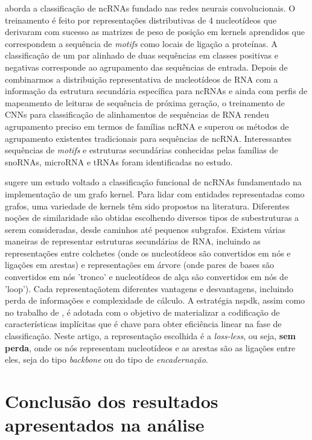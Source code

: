 \cite{cnn-article} aborda a classificação de ncRNAs fundado nas redes neurais convolucionais. O treinamento é feito por representações distributivas de 4 nucleotídeos que derivaram com sucesso as matrizes de peso de posição em kernels aprendidos que correspondem a sequência de \textit{motifs} como locais de ligação a proteínas. A classificação de um par alinhado de duas sequências em classes positivas e negativas corresponde ao agrupamento das sequências de entrada. Depois de combinarmos a distribuição
representativa de nucleotídeos de RNA com a informação da estrutura secundária específica para \ac{ncRNAs}
e ainda com perfis de mapeamento de leituras de sequência de próxima geração, o treinamento de CNNs
para classificação de alinhamentos de sequências de RNA rendeu agrupamento preciso em termos de famílias ncRNA e superou os métodos de agrupamento existentes tradicionais para sequências de ncRNA. Interessantes sequências de \textit{motifs} e estruturas secundárias conhecidas pelas famílias de snoRNAs, microRNA e tRNAs foram identificadas no estudo.

\cite{graph-kernel-article} sugere um estudo voltado a classificação funcional de ncRNAs fundamentado na implementação de um grafo kernel. Para lidar com entidades representadas como grafos, uma variedade de
kernels têm sido propostos na literatura. Diferentes noções de similaridade são obtidas escolhendo diversos tipos de subestruturas a serem consideradas, desde caminhos até pequenos subgrafos. Existem várias maneiras de representar estruturas secundárias de RNA, incluindo as representações entre colchetes (onde os nucleotídeos são convertidos em nós e ligações em arestas) e representações em árvore (onde pares de bases são convertidos em nós 'tronco' e nucleotídeos de alça são convertidos em nós de 'loop'). Cada representaçãotem diferentes vantagens e desvantagens, incluindo perda de informações e complexidade
de cálculo. A estratégia \ac{nspdk}, assim como no trabalho de \cite{snoReport-article}, é adotada com o objetivo de materializar a codificação de características implícitas que é chave para obter eficiência linear na fase de classificação. Neste artigo, a representação escolhida é a \textit{loss-less}, ou seja, \textbf{sem perda}, onde os nós representam nucleotídeos e as arestas são as ligações entre eles, seja do tipo \textit{backbone} ou do tipo de \textit{encadernação}.

\cite{}

\section{Conclusão dos resultados apresentados na análise}

